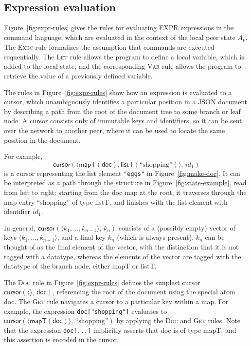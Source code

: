 \documentclass[a4paper,twocolumn,10pt]{article}
\begin{document}
\subsection{Expression evaluation}

Figure~\ref{fig:expr-rules} gives the rules for evaluating EXPR expressions in the command language, which are evaluated in the context of the local peer state $A_p$. The \textsc{Exec} rule formalizes the assumption that commands are executed sequentially. The \textsc{Let} rule allows the program to define a local variable, which is added to the local state, and the corresponding \textsc{Var} rule allows the program to retrieve the value of a previously defined variable.

The rules in Figure~\ref{fig:expr-rules} show how an expression is evaluated to a cursor, which unambiguously identifies a particular position in a JSON document by describing a path from the root of the document tree to some branch or leaf node. A cursor consists only of immutable keys and identifiers, so it can be sent over the network to another peer, where it can be used to locate the same position in the document.

For example,
\[ \mathsf{cursor}(\langle \mathsf{mapT}(\mathsf{doc}), \mathsf{listT}(\text{``shopping''}) \rangle,\, \mathit{id}_1) \]
is a cursor representing the list element \verb|"eggs"| in Figure~\ref{fig:make-doc}. It can be interpreted as a path through the structure in Figure~\ref{fig:state-example}, read from left to right: starting from the \textsf{doc} map at the root, it traverses through the map entry ``shopping'' of type \textsf{listT}, and finishes with the list element with identifier $\mathit{id}_1$.

In general, $\mathsf{cursor}(\langle k_1, \dots, k_{n-1} \rangle,\, k_n)$ consists of a (possibly empty) vector of keys $\langle k_1, \dots, k_{n-1} \rangle$, and a final key $k_n$ (which is always present). $k_n$ can be thought of as the final element of the vector, with the distinction that it is not tagged with a datatype, whereas the elements of the vector are tagged with the datatype of the branch node, either \textsf{mapT} or \textsf{listT}.

The \textsc{Doc} rule in Figure~\ref{fig:expr-rules} defines the simplest cursor $\mathsf{cursor}(\langle\rangle,\, \mathsf{doc})$, referencing the root of the document using the special atom \textsf{doc}. The \textsc{Get} rule navigates a cursor to a particular key within a map. For example, the expression \verb|doc["shopping"]| evaluates to $\mathsf{cursor}(\langle \mathsf{mapT}(\mathsf{doc}) \rangle,\, \text{``shopping''})$ by applying the \textsc{Doc} and \textsc{Get} rules. Note that the expression \verb|doc[...]| implicitly asserts that \textsf{doc} is of type \textsf{mapT}, and this assertion is encoded in the cursor.
\end{document}
